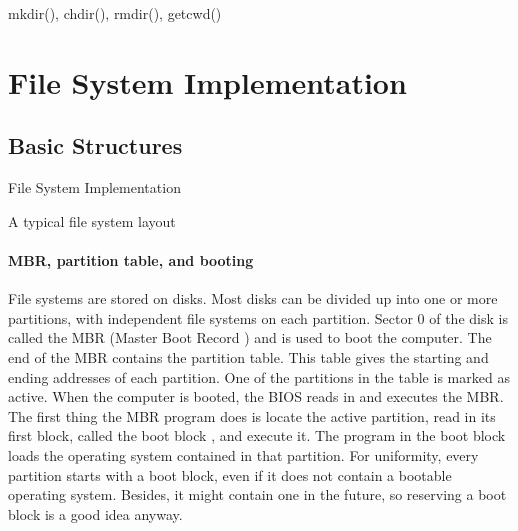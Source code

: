 \begin{frame}{\ttfamily mkdir(), chdir(), rmdir(), getcwd()}
  \centering
\end{frame}

\section{File System Implementation}

\subsection{Basic Structures}

\begin{frame}{File System Implementation}
  \begin{block}{A typical file system layout}
    \begin{center}
    \end{center}
  \end{block}
  \begin{center}
  \end{center}
\end{frame}

\paragraph{MBR, partition table, and booting}

File systems are stored on disks. Most disks can be divided up into one or more
partitions, with independent file systems on each partition. Sector 0 of the disk is
called the MBR (Master Boot Record ) and is used to boot the computer. The end of the MBR
contains the partition table. This table gives the starting and ending addresses of each
partition. One of the partitions in the table is marked as active. When the computer is
booted, the BIOS reads in and executes the MBR. The first thing the MBR program does is
locate the active partition, read in its first block, called the boot block , and execute
it. The program in the boot block loads the operating system contained in that
partition. For uniformity, every partition starts with a boot block, even if it does not
contain a bootable operating system.  Besides, it might contain one in the future, so
reserving a boot block is a good idea anyway.

